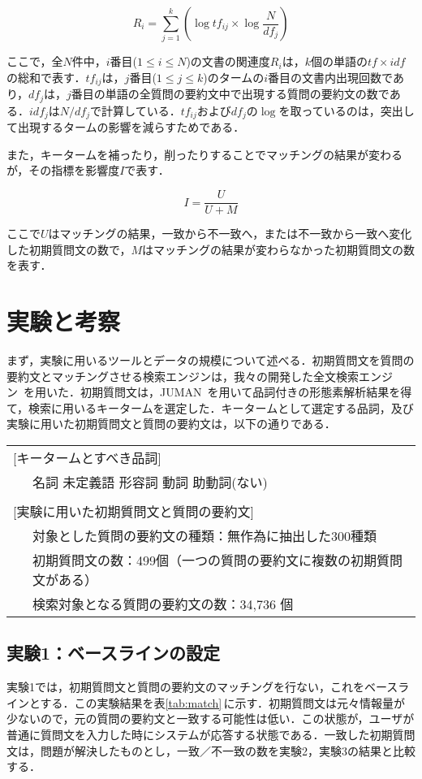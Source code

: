 \[
 R_i = \sum_{j=1}^{k} \left( \log tf_{ij} \times \log \frac{N}{df_j} \right)
\]

ここで，全$N$件中，$i$番目($1 \leq i \leq N$)の文書の関連度$R_i$は，$k$個の単語の$tf \times idf$の総和で表す．$tf_{ij}$は，$j$番目($1 \leq j \leq k$)のタームの$i$番目の文書内出現回数であり，$df_j$は，$j$番目の単語の全質問の要約文中で出現する質問の要約文の数である．$idf_j$は$N / df_j$で計算している．$tf_{ij}$および$df_j$の$\log$を取っているのは，突出して出現するタームの影響を減らすためである．

また，キータームを補ったり，削ったりすることでマッチングの結果が変わるが，その指標を影響度$I$で表す．

\[
 I = \frac{U}{U+M}
\]

ここで$U$はマッチングの結果，一致から不一致へ，または不一致から一致へ変化した初期質問文の数で，$M$はマッチングの結果が変わらなかった初期質問文の数を表す．


\section{実験と考察}\label{sec:5}
まず，実験に用いるツールとデータの規模について述べる．初期質問文を質問の要約文とマッチングさせる検索エンジンは，我々の開発した全文検索エンジン~\cite{matui}を用いた．初期質問文は，JUMAN~\cite{juman}を用いて品詞付きの形態素解析結果を得て，検索に用いるキータームを選定した．キータームとして選定する品詞，及び実験に用いた初期質問文と質問の要約文は，以下の通りである．

\begin{tabular}[t]{ll}
 \\
 \multicolumn{2}{l}{[キータームとすべき品詞]}\\
 ~ & 名詞 未定義語 形容詞 動詞 助動詞(ない) \\
 \\
 \multicolumn{2}{l}{[実験に用いた初期質問文と質問の要約文]}\\
 ~ & 対象とした質問の要約文の種類：無作為に抽出した300種類 \\
 ~ & 初期質問文の数：499個（一つの質問の要約文に複数の初期質問文がある）\\
 ~ & 検索対象となる質問の要約文の数：34,736 個 \\
\end{tabular}

\subsection{実験1：ベースラインの設定}
実験1では，初期質問文と質問の要約文のマッチングを行ない，これをベースラインとする．この実験結果を表\ref{tab:match}\,に示す．初期質問文は元々情報量が少ないので，元の質問の要約文と一致する可能性は低い．この状態が，ユーザが普通に質問文を入力した時にシステムが応答する状態である．一致した初期質問文は，問題が解決したものとし，一致／不一致の数を実験2，実験3の結果と比較する．

